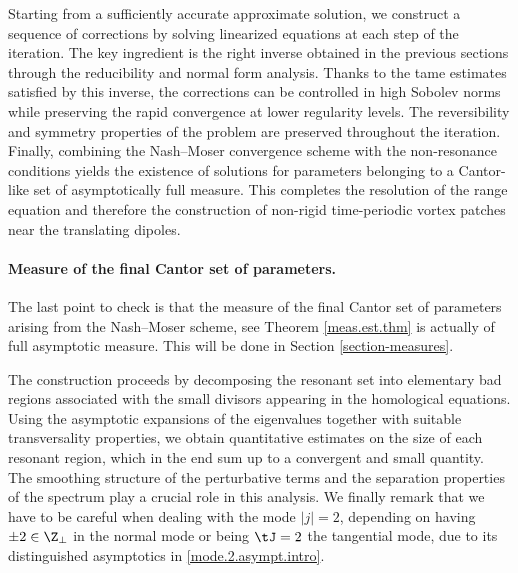 \documentclass[a4paper,reqno,10pt]{article}
\begin{document}
\begin{itemize}
Starting from a sufficiently accurate approximate solution, we construct a sequence of corrections by solving linearized equations at each step of the iteration. The key ingredient is the right inverse obtained in the previous sections through the reducibility and normal form analysis. Thanks to the tame estimates satisfied by this inverse, the corrections can be controlled in high Sobolev norms while preserving the rapid convergence at lower regularity levels.  
The reversibility and symmetry properties of the problem are preserved throughout the iteration.  
Finally, combining the Nash--Moser convergence scheme with the non-resonance conditions yields the existence of solutions for parameters belonging to a Cantor-like set of asymptotically full measure. This completes the resolution of the range equation and therefore the construction of non-rigid time-periodic vortex patches near the translating dipoles.
\end{itemize}






\paragraph{Measure of the final Cantor set of parameters.}
The last point to check is that the measure of the final Cantor set of parameters arising from the Nash--Moser scheme, see Theorem \ref{meas.est.thm} is actually of full asymptotic measure. This will be done in
Section \ref{section-measures}. 

The construction proceeds by decomposing the resonant set into elementary bad regions associated with the small divisors appearing in the homological equations. Using the asymptotic expansions of the eigenvalues together with suitable transversality properties, we obtain quantitative estimates on the size of each resonant region, which in the end sum up to a convergent and small quantity.  The smoothing structure of the perturbative terms and the separation properties of the spectrum play a crucial role in this analysis.  We finally remark that we have to be careful when dealing with  the mode $|j|=2$, depending on having $\pm 2 \in \Z_{\perp}$ in the normal mode or being $\tJ=2$ the tangential mode, due to its distinguished asymptotics in \eqref{mode.2.asympt.intro}.
\end{document}
